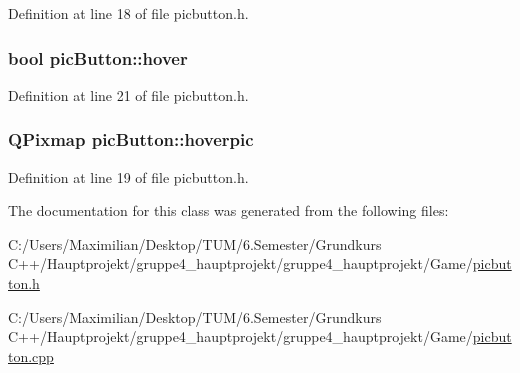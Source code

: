 Definition at line 18 of file picbutton.\+h.

\subsubsection[{\texorpdfstring{hover}{hover}}]{\setlength{\rightskip}{0pt plus 5cm}bool pic\+Button\+::hover}\hypertarget{classpic_button_ab011ab567cb14054023cc46cfc3110c1}{}\label{classpic_button_ab011ab567cb14054023cc46cfc3110c1}


Definition at line 21 of file picbutton.\+h.

\subsubsection[{\texorpdfstring{hoverpic}{hoverpic}}]{\setlength{\rightskip}{0pt plus 5cm}Q\+Pixmap pic\+Button\+::hoverpic}\hypertarget{classpic_button_a6e387b9fc6348b681a786db8452fbc9d}{}\label{classpic_button_a6e387b9fc6348b681a786db8452fbc9d}


Definition at line 19 of file picbutton.\+h.



The documentation for this class was generated from the following files\+:\begin{DoxyCompactItemize}
\item 
C\+:/\+Users/\+Maximilian/\+Desktop/\+T\+U\+M/6.\+Semester/\+Grundkurs C++/\+Hauptprojekt/gruppe4\+\_\+hauptprojekt/gruppe4\+\_\+hauptprojekt/\+Game/\hyperlink{picbutton_8h}{picbutton.\+h}\item 
C\+:/\+Users/\+Maximilian/\+Desktop/\+T\+U\+M/6.\+Semester/\+Grundkurs C++/\+Hauptprojekt/gruppe4\+\_\+hauptprojekt/gruppe4\+\_\+hauptprojekt/\+Game/\hyperlink{picbutton_8cpp}{picbutton.\+cpp}\end{DoxyCompactItemize}
